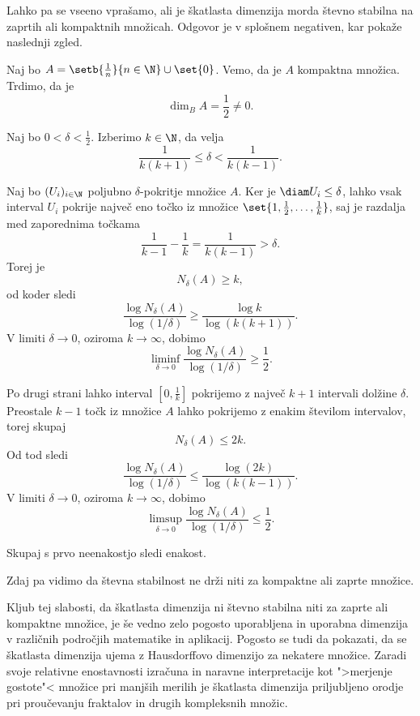 Lahko pa se vseeno vprašamo, ali je škatlasta dimenzija morda števno stabilna na zaprtih ali kompaktnih množicah. Odgovor je v splošnem negativen, kar pokaže naslednji zgled.

\begin{zgled}
    Naj bo \(A = \setb{\frac{1}{n}}{n \in \N} \cup \set{0}\). Vemo, da je \(A\) kompaktna množica. Trdimo, da je 
    \[\dim_B A = \frac{1}{2} \neq 0.\]
    
    Naj bo \(0 < \delta < \frac{1}{2}\). Izberimo \(k \in \N\), da velja
    \[
    \frac{1}{k(k+1)} \leq \delta < \frac{1}{k(k-1)}.
    \]

    Naj bo \((U_i)_{i \in \N}\) poljubno \(\delta\)-pokritje množice \(A\). Ker je \(\diam U_i \leq \delta\), lahko vsak interval \(U_i\) pokrije največ eno točko iz množice  \(\set{1, \frac{1}{2}, \ldots, \frac{1}{k}}\), saj je razdalja med zaporednima točkama 
    \[
    \frac{1}{k-1} - \frac{1}{k} = \frac{1}{k(k-1)} > \delta.
    \]
    Torej je 
    \[
    N_\delta(A) \geq k,
    \]
    od koder sledi
    \[
    \frac{\log N_\delta(A)}{\log (1 / \delta)} \geq \frac{\log k}{\log (k(k+1))}.
    \]
    V limiti \(\delta \to 0\), oziroma \(k \to \infty\), dobimo
    \[
    \liminf_{\delta \to 0} \frac{\log N_\delta(A)}{\log (1 / \delta)} \geq \frac{1}{2}.
    \]

    Po drugi strani lahko interval \([0, \frac{1}{k}]\) pokrijemo z največ \(k+1\) intervali dolžine \(\delta\). Preostale \(k-1\) točk iz množice \(A\) lahko pokrijemo z enakim številom intervalov, torej skupaj 
    \[
    N_\delta(A) \leq 2k.
    \]
    Od tod sledi
    \[
    \frac{\log N_\delta(A)}{\log (1 / \delta)} \leq \frac{\log (2k)}{\log (k(k-1))}.
    \]
    V limiti \(\delta \to 0\), oziroma \(k \to \infty\), dobimo
    \[
    \limsup_{\delta \to 0} \frac{\log N_\delta(A)}{\log (1 / \delta)} \leq \frac{1}{2}.
    \]
    
    Skupaj s prvo neenakostjo sledi enakost.
\end{zgled}

Zdaj pa vidimo da števna stabilnost ne drži niti za kompaktne ali zaprte množice.

Kljub tej slabosti, da škatlasta dimenzija ni števno stabilna niti za zaprte ali kompaktne množice, je še vedno zelo pogosto uporabljena in uporabna dimenzija v različnih področjih matematike in aplikacij. Pogosto se tudi da pokazati, da se škatlasta dimenzija ujema z Hausdorffovo dimenzijo za nekatere množice. Zaradi svoje relativne enostavnosti izračuna in naravne interpretacije kot ">merjenje gostote"< množice pri manjših merilih je škatlasta dimenzija priljubljeno orodje pri proučevanju fraktalov in drugih kompleksnih množic.